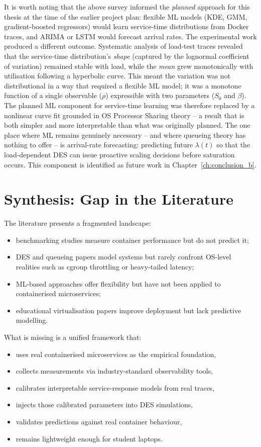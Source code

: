 It is worth noting that the above survey informed the \emph{planned} approach for this thesis at the time of the earlier project plan: flexible ML models (KDE, GMM, gradient-boosted regressors) would learn service-time distributions from Docker traces, and ARIMA or LSTM would forecast arrival rates. The experimental work produced a different outcome. Systematic analysis of load-test traces revealed that the service-time distribution's \emph{shape} (captured by the lognormal coefficient of variation) remained stable with load, while the \emph{mean} grew monotonically with utilisation following a hyperbolic curve. This meant the variation was not distributional in a way that required a flexible ML model; it was a monotone function of a single observable ($\rho$) expressible with two parameters ($S_0$ and $\beta$). The planned ML component for service-time learning was therefore replaced by a nonlinear curve fit grounded in OS Processor Sharing theory -- a result that is both simpler and more interpretable than what was originally planned. The one place where ML remains genuinely necessary -- and where queueing theory has nothing to offer -- is arrival-rate forecasting: predicting future $\lambda(t)$ so that the load-dependent DES can issue proactive scaling decisions before saturation occurs. This component is identified as future work in Chapter~\ref{ch:conclusion_b}.

\section{Synthesis: Gap in the Literature}

The literature presents a fragmented landscape:

\begin{itemize}
    \item benchmarking studies measure container performance but do not predict it;
    \item DES and queueing papers model systems but rarely confront OS-level realities such as cgroup throttling or heavy-tailed latency;
    \item ML-based approaches offer flexibility but have not been applied to containerised microservices;
    \item educational virtualisation papers improve deployment but lack predictive modelling.
\end{itemize}

What is missing is a unified framework that:

\begin{itemize}
    \item uses real containerised microservices as the empirical foundation,
    \item collects measurements via industry-standard observability tools,
    \item calibrates interpretable service-response models from real traces,
    \item injects those calibrated parameters into DES simulations,
    \item validates predictions against real container behaviour,
    \item remains lightweight enough for student laptops.
\end{itemize}

